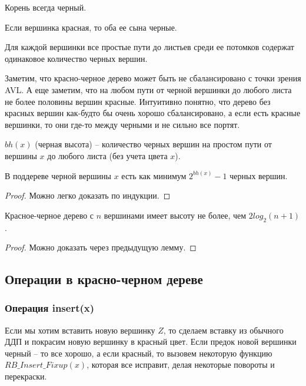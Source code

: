 \begin{invariant}
    Корень всегда черный.
\end{invariant}
\begin{invariant}
    Если вершинка красная, то оба ее сына черные.
\end{invariant}
\begin{invariant}
    Для каждой вершинки все простые пути до листьев среди ее потомков содержат одинаковое количество черных вершин.
\end{invariant}

Заметим, что красно-черное дерево может быть не сбалансировано с точки зрения AVL. А еще заметим, что на любом пути от черной вершинки до любого листа не более половины вершин красные. Интуитивно понятно, что дерево без красных вершин как-будто бы очень хорошо сбалансировано, а если есть красные вершинки, то они где-то между черными и не сильно все портят.

\begin{definition}
    $bh(x)$ (черная высота) -- количество черных вершин на простом пути от вершины $x$ до любого листа (без учета цвета $x$).
\end{definition}

\begin{lemma}
    В поддереве черной вершины $x$ есть как минимум $2^{bh(x)} - 1$ черных вершин.
\end{lemma}
\begin{proof}
    Можно легко доказать по индукции.
\end{proof}

\begin{lemma}
    Красное-черное дерево с $n$ вершинами имеет высоту не более, чем $2log_2(n+1)$.
\end{lemma}
\begin{proof}
    Можно доказать через предыдущую лемму.
\end{proof}



\subsection{Операции в красно-черном дереве}



\subsubsection{Операция insert(x)}

Если мы хотим вставить новую вершинку $Z$, то сделаем вставку из обычного ДДП и покрасим новую вершинку в красный цвет. Если предок новой вершинки черный -- то все хорошо, а если красный, то вызовем некоторую функцию $RB\_Insert\_Fixup(x)$, которая все исправит, делая некоторые повороты и перекраски. \pagebreak

